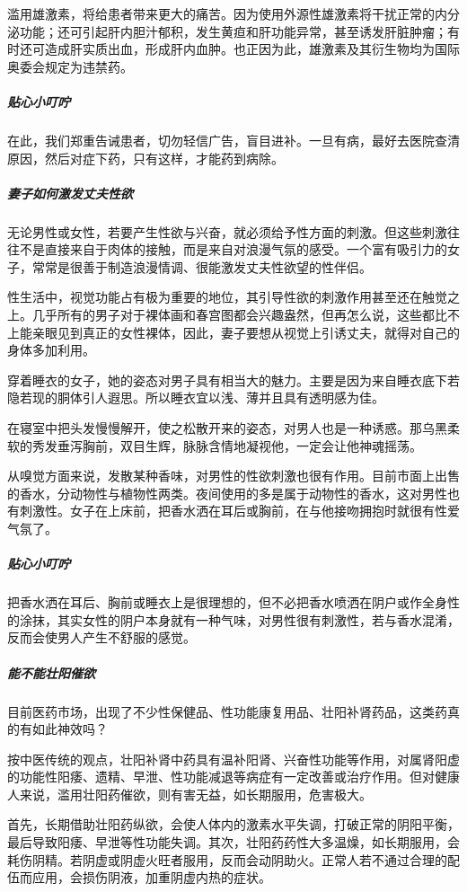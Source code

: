 \begin{enumerate}
滥用雄激素，将给患者带来更大的痛苦。因为使用外源性雄激素将干扰正常的内分泌功能；还可引起肝内胆汁郁积，发生黄疸和肝功能异常，甚至诱发肝脏肿瘤；有时还可造成肝实质出血，形成肝内血肿。也正因为此，雄激素及其衍生物均为国际奥委会规定为违禁药。

\subparagraph{贴心小叮咛}

在此，我们郑重告诫患者，切勿轻信广告，盲目进补。一旦有病，最好去医院查清原因，然后对症下药，只有这样，才能药到病除。

\subparagraph{妻子如何激发丈夫性欲}

无论男性或女性，若要产生性欲与兴奋，就必须给予性方面的刺激。但这些刺激往往不是直接来自于肉体的接触，而是来自对浪漫气氛的感受。一个富有吸引力的女子，常常是很善于制造浪漫情调、很能激发丈夫性欲望的性伴侣。

性生活中，视觉功能占有极为重要的地位，其引导性欲的刺激作用甚至还在触觉之上。几乎所有的男子对于裸体画和春宫图都会兴趣盎然，但再怎么说，这些都比不上能亲眼见到真正的女性裸体，因此，妻子要想从视觉上引诱丈夫，就得对自己的身体多加利用。

穿着睡衣的女子，她的姿态对男子具有相当大的魅力。主要是因为来自睡衣底下若隐若现的胴体引人遐思。所以睡衣宜以浅、薄并且具有透明感为佳。

在寝室中把头发慢慢解开，使之松散开来的姿态，对男人也是一种诱惑。那乌黑柔软的秀发垂泻胸前，双目生辉，脉脉含情地凝视他，一定会让他神魂摇荡。

从嗅觉方面来说，发散某种香味，对男性的性欲刺激也很有作用。目前市面上出售的香水，分动物性与植物性两类。夜间使用的多是属于动物性的香水，这对男性也有刺激性。女子在上床前，把香水洒在耳后或胸前，在与他接吻拥抱时就很有性爱气氛了。

\subparagraph{贴心小叮咛}

把香水洒在耳后、胸前或睡衣上是很理想的，但不必把香水喷洒在阴户或作全身性的涂抹，其实女性的阴户本身就有一种气味，对男性很有刺激性，若与香水混淆，反而会使男人产生不舒服的感觉。

\subparagraph{能不能壮阳催欲}

目前医药市场，出现了不少性保健品、性功能康复用品、壮阳补肾药品，这类药真的有如此神效吗？

按中医传统的观点，壮阳补肾中药具有温补阳肾、兴奋性功能等作用，对属肾阳虚的功能性阳痿、遗精、早泄、性功能减退等病症有一定改善或治疗作用。但对健康人来说，滥用壮阳药催欲，则有害无益，如长期服用，危害极大。

首先，长期借助壮阳药纵欲，会使人体内的激素水平失调，打破正常的阴阳平衡，最后导致阳痿、早泄等性功能失调。其次，壮阳药药性大多温燥，如长期服用，会耗伤阴精。若阴虚或阴虚火旺者服用，反而会动阴助火。正常人若不通过合理的配伍而应用，会损伤阴液，加重阴虚内热的症状。


\end{enumerate}
